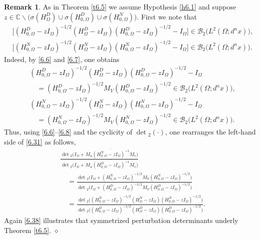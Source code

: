 \documentclass[reqno,10pt, centertags]{amsart}
\newcommand{\bbC}{{\mathbb{C}}}
\newcommand{\cB}{{\mathcal B}}
\newcommand{\no}{\nonumber}
\newcommand{\lb}{\label}
\newcommand{\ol}{\overline}
\newcommand{\si}{\sigma}
\newcommand{\Om}{\Omega}
\numberwithin{equation}{section}
\theoremstyle{definition}
\newtheorem{remark}[theorem]{Remark}
\begin{document}
\begin{remark} \lb{r6.13}
As in Theorem \ref{t6.5} we assume Hypothesis \ref{h6.1} and suppose
$z\in\bbC\backslash \big(\si(H_{\Om}^D)\cup
\si(H_{0,\Om}^D) \cup \si(H_{0,\Om}^N)\big)$. First we note that
\begin{align}
&\big[(H_{0,\Om}^D-zI_{\Om})^{-1/2}
(H_{\Om}^D-zI_{\Om})(H_{0,\Om}^D-zI_{\Om})^{-1/2} - I_\Om\big]
\in\cB_2\big(L^2(\Om;d^nx)\big),
\\
&\big[(H_{0,\Om}^N-zI_{\Om})^{-1/2}
(H_{\Om}^N-zI_{\Om})(H_{0,\Om}^N-zI_{\Om})^{-1/2} - I_\Om\big]
\in\cB_2\big(L^2(\Om;d^nx)\big).
\end{align}
Indeed, by \eqref{6.6} and \eqref{6.7}, one obtains
\begin{align}
&(H_{0,\Om}^D-zI_{\Om})^{-1/2}
(H_{\Om}^D-zI_{\Om})(H_{0,\Om}^D-zI_{\Om})^{-1/2} - I_\Om  \no
\\
&\quad =
(H_{0,\Om}^D-zI_{\Om})^{-1/2}M_V(H_{0,\Om}^D-zI_{\Om})^{-1/2}
\in\cB_2\big(L^2(\Om;d^nx)\big),
\\
&(H_{0,\Om}^N-zI_{\Om})^{-1/2}
(H_{\Om}^N-zI_{\Om})(H_{0,\Om}^N-zI_{\Om})^{-1/2} - I_\Om  \no
\\
&\quad =
(H_{0,\Om}^N-zI_{\Om})^{-1/2}M_V(H_{0,\Om}^N-zI_{\Om})^{-1/2}
\in\cB_2\big(L^2(\Om;d^nx)\big).
\end{align}
Thus, using \eqref{6.6}--\eqref{6.8} and the cyclicity of
$\det{}_2(\cdot)$, one rearranges the left-hand side of \eqref{6.31} as
follows,
\begin{align}
& \frac{\det{}_2\big(I_{\Om}+\ol{M_u(H_{0,\Om}^N-zI_{\Om})^{-1}M_v}\big)}
{\det{}_2\big(I_{\Om}+\ol{M_u(H_{0,\Om}^D-zI_{\Om})^{-1}M_v}\big)}  \no \\
& \quad =
\frac{\det{}_2\big(I_{\Om}+(H_{0,\Om}^N-zI_{\Om})^{-1/2}M_V
(H_{0,\Om}^N-zI_{\Om})^{-1/2}\big)}
{\det{}_2\big(I_{\Om}+(H_{0,\Om}^D-zI_{\Om})^{-1/2}M_V
(H_{0,\Om}^D-zI_{\Om})^{-1/2}\big)}  \no \\
& \quad =\frac{\det{}_2\big((H_{0,\Om}^N-zI_{\Om})^{-1/2}(H_{\Om}^N
-zI_{\Om})(H_{0,\Om}^N-zI_{\Om})^{-1/2}\big)}
{\det{}_2\big((H_{0,\Om}^D-zI_{\Om})^{-1/2}(H_{\Om}^D-zI_{\Om})
(H_{0,\Om}^D-zI_{\Om})^{-1/2}\big)}.  \lb{6.38}
\end{align}
Again \eqref{6.38} illustrates that symmetrized perturbation determinants
underly Theorem \ref{t6.5}. \hfill $\diamond$
\end{remark}
\end{document}
